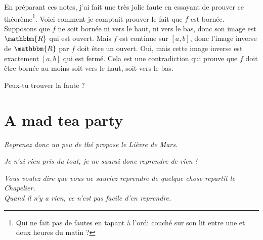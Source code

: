 \documentclass[a4paper,12pt]{book}
\newcommand{\eR}{\mathbbm{R}}
\theoremstyle{mes_exemples}	\newtheorem{exemple}[numtho]{Exemple}
\theoremstyle{mes_tho}
\begin{document}
En préparant ces notes, j'ai fait une très jolie faute en essayant de prouver ce théorème\footnote{Qui ne fait pas de fautes en tapant à l'ordi couché sur son lit entre une et deux heures du matin ?}. Voici comment je comptait prouver le fait que $f$ est bornée. Supposons que $f$ ne soit bornée ni vers le haut, ni vers le bas, donc son image est $\eR$ qui est ouvert. Mais $f$ est continue sur $[a,b]$, donc l'image inverse de $\eR$ par $f$ doit être un ouvert. Oui, mais cette image inverse est exactement $[a,b]$ qui est fermé. Cela est une contradiction qui prouve que $f$ doit être bornée au moins soit vers le haut, soit vers le bas.

Peux-tu trouver la faute ?


\section{A mad tea party}	\label{PgMadTeaParty}

\textit{\og Reprenez donc un peu de thé\fg{} propose le Lièvre de Mars.}

\textit{\og Je n'ai rien pris du tout, je ne saurai donc reprendre de rien !\fg}

\textit{\og Vous voulez dire que vous ne sauriez reprendre de quelque chose\fg{} repartit le Chapelier.\\
 \og Quand il n'y a rien, ce n'est pas
facile d'en reprendre\fg.}
\end{document}
